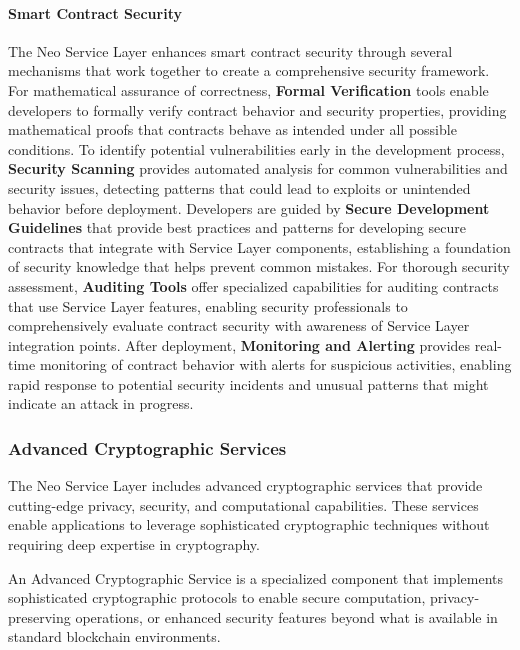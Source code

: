 \documentclass[12pt,a4paper]{article}
\begin{document}
\paragraph{Smart Contract Security}
The Neo Service Layer enhances smart contract security through several mechanisms that work together to create a comprehensive security framework. For mathematical assurance of correctness, \textbf{Formal Verification} tools enable developers to formally verify contract behavior and security properties, providing mathematical proofs that contracts behave as intended under all possible conditions. To identify potential vulnerabilities early in the development process, \textbf{Security Scanning} provides automated analysis for common vulnerabilities and security issues, detecting patterns that could lead to exploits or unintended behavior before deployment. Developers are guided by \textbf{Secure Development Guidelines} that provide best practices and patterns for developing secure contracts that integrate with Service Layer components, establishing a foundation of security knowledge that helps prevent common mistakes. For thorough security assessment, \textbf{Auditing Tools} offer specialized capabilities for auditing contracts that use Service Layer features, enabling security professionals to comprehensively evaluate contract security with awareness of Service Layer integration points. After deployment, \textbf{Monitoring and Alerting} provides real-time monitoring of contract behavior with alerts for suspicious activities, enabling rapid response to potential security incidents and unusual patterns that might indicate an attack in progress.

\subsubsection{Advanced Cryptographic Services}
\label{subsubsec:advanced-crypto}

The Neo Service Layer includes advanced cryptographic services that provide cutting-edge privacy, security, and computational capabilities. These services enable applications to leverage sophisticated cryptographic techniques without requiring deep expertise in cryptography.



\begin{definition}
An Advanced Cryptographic Service is a specialized component that implements sophisticated cryptographic protocols to enable secure computation, privacy-preserving operations, or enhanced security features beyond what is available in standard blockchain environments.
\end{definition}
\end{document}
